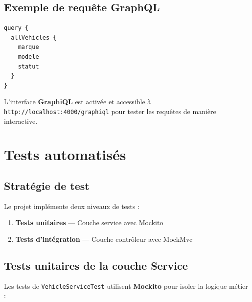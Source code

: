\documentclass[12pt,a4paper]{report}
\begin{document}
\section{Exemple de requ\^ete GraphQL}

\begin{lstlisting}[style=graphqlstyle, caption={Requ\^ete pour obtenir marque et mod\`ele}]
query {
  allVehicles {
    marque
    modele
    statut
  }
}
\end{lstlisting}

\begin{infobox}
L'interface \textbf{GraphiQL} est activ\'ee et accessible \`a \texttt{http://localhost:4000/graphiql} pour tester les requ\^etes de mani\`ere interactive.
\end{infobox}

\chapter{Tests automatis\'es}

\section{Strat\'egie de test}

Le projet impl\'emente deux niveaux de tests :

\begin{enumerate}
    \item \textbf{Tests unitaires} --- Couche service avec Mockito
    \item \textbf{Tests d'int\'egration} --- Couche contr\^oleur avec MockMvc
\end{enumerate}

\section{Tests unitaires de la couche Service}

Les tests de \texttt{VehicleServiceTest} utilisent \textbf{Mockito} pour isoler la logique m\'etier :
\end{document}
